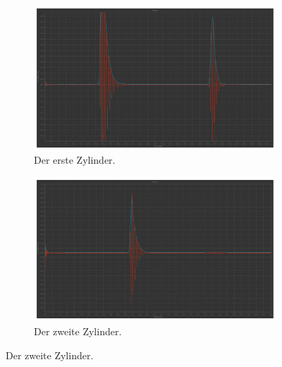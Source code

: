 \begin{figure}[H]
  \begin{subfigure}{0.48\textwidth}%
  \centering%
  \includegraphics[width=\linewidth]{pictures/Durchschallung/z1.pdf}%
  \caption{Der erste Zylinder.}%
  \label{fig:durchschallung_z1}%
  \end{subfigure}%
  \hfill%
  \begin{subfigure}{0.48\textwidth}%
  \centering%
  \includegraphics[width=\linewidth]{pictures/Durchschallung/z2.pdf}%
  \caption{Der zweite Zylinder.}%
  \label{fig:durchschallung_z2}%
  \end{subfigure}%
  \hfill


\end{figure}
